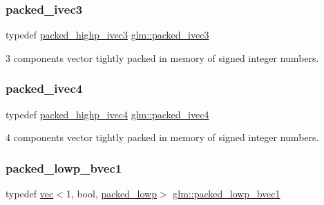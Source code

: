 \subsubsection{\texorpdfstring{packed\+\_\+ivec3}{packed\_ivec3}}
{\footnotesize\ttfamily typedef \hyperlink{group__gtc__type__aligned_ga56b9f0123506edc416bbcf957d3ce678}{packed\+\_\+highp\+\_\+ivec3} \hyperlink{group__gtc__type__aligned_gae3121f35a569fd14475ff5f4d28bd98e}{glm\+::packed\+\_\+ivec3}}



3 components vector tightly packed in memory of signed integer numbers. 

\mbox{\label{group__gtc__type__aligned_gaf87b2eccca075255f5ed368dfb1ecc31}} 
\subsubsection{\texorpdfstring{packed\+\_\+ivec4}{packed\_ivec4}}
{\footnotesize\ttfamily typedef \hyperlink{group__gtc__type__aligned_gabf988b7dc66612bc1d4c9ce44d5b5642}{packed\+\_\+highp\+\_\+ivec4} \hyperlink{group__gtc__type__aligned_gaf87b2eccca075255f5ed368dfb1ecc31}{glm\+::packed\+\_\+ivec4}}



4 components vector tightly packed in memory of signed integer numbers. 

\mbox{\label{group__gtc__type__aligned_gab43c5df4bb326006091ee3489bc1c367}} 
\subsubsection{\texorpdfstring{packed\+\_\+lowp\+\_\+bvec1}{packed\_lowp\_bvec1}}
{\footnotesize\ttfamily typedef \hyperlink{structglm_1_1vec}{vec}$<$1, bool, \hyperlink{namespaceglm_a36ed105b07c7746804d7fdc7cc90ff25ac36a4bd74559be2c0b65bc48e5953b8b}{packed\+\_\+lowp}$>$ \hyperlink{group__gtc__type__aligned_gab43c5df4bb326006091ee3489bc1c367}{glm\+::packed\+\_\+lowp\+\_\+bvec1}}



